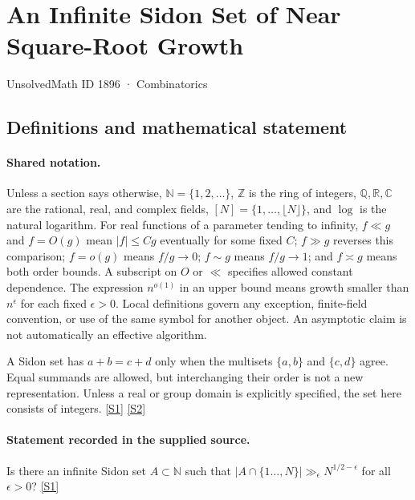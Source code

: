 \documentclass[11pt,a4paper]{article}
\newcommand{\N}{\mathbb{N}}
\newcommand{\Z}{\mathbb{Z}}
\newcommand{\Q}{\mathbb{Q}}
\newcommand{\R}{\mathbb{R}}
\newcommand{\C}{\mathbb{C}}
\newcommand{\sref}[2]{\hyperlink{source:#1:#2}{[S#2]}}
\begin{document}

\setcounter{section}{1895}

\section{An Infinite Sidon Set of Near Square-Root Growth}\label{1896}

{\small\sffamily UnsolvedMath ID 1896 · Combinatorics}

\subsection{Definitions and mathematical statement}

\paragraph{Shared notation.}Unless a section says otherwise, $\N=\{1,2,\ldots\}$,
$\Z$ is the ring of integers, $\Q,\R,\C$ are the rational, real, and complex
fields, $[N]=\{1,\ldots,\lfloor N\rfloor\}$, and $\log$ is the natural
logarithm. For real functions of a parameter tending to infinity,
$f\ll g$ and $f=O(g)$ mean $|f|\leq Cg$ eventually for some fixed $C$;
$f\gg g$ reverses this comparison; $f=o(g)$ means $f/g\to0$;
$f\sim g$ means $f/g\to1$; and $f\asymp g$ means both order bounds.
A subscript on $O$ or $\ll$ specifies allowed constant dependence.
The expression $n^{o(1)}$ in an upper bound means growth smaller than
$n^\epsilon$ for each fixed $\epsilon>0$. Local definitions govern any
exception, finite-field convention, or use of the same symbol for another
object. An asymptotic claim is not automatically an effective algorithm.



A Sidon set has $a+b=c+d$ only when the multisets $\{a,b\}$ and $\{c,d\}$ agree. Equal summands are allowed, but interchanging their order is not a new representation. Unless a real or group domain is explicitly specified, the set here consists of integers. \sref{1896}{1} \sref{1896}{2}

\paragraph{Statement recorded in the supplied source.}
Is there an infinite Sidon set $A\subset \mathbb{N}$ such that $ \lvert A\cap \{1\ldots,N\}\rvert \gg_\epsilon N^{1/2-\epsilon} $ for all $\epsilon>0$? \sref{1896}{1}
\end{document}
